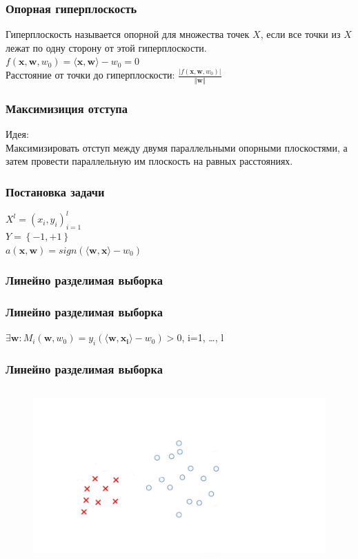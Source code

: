 \documentclass[12pt]{beamer}
\begin{document}
\begin{frame}\frametitle{Опорная гиперплоскость}
Гиперплоскость называется опорной для множества точек
$X$, если все точки из $X$ лежат по одну сторону от этой гиперплоскости.\\\vspace{5mm}
${f(\mathbf{x},\mathbf{w}, w_0) = \langle \mathbf{x}, \mathbf{w}\rangle - w_0 = 0}$\\
\vspace{5mm}
Расстояние от точки до гиперплоскости:
$\frac{\vert f(\mathbf{x},\mathbf{w}, w_0) \vert}{\Vert \mathbf{w} \Vert}$
\end{frame}

\begin{frame}\frametitle{Максимизиция отступа}
Идея:\\
Максимизировать отступ между двумя параллельными опорными плоскостями, а затем провести параллельную им плоскость на равных расстояниях.\\
\end{frame}

\begin{frame}\frametitle{Постановка задачи}
${X^l = (x_i,y_i)_{i = 1}^l}$\\ 
${Y=\left\{-1,+1\right\}}$\\
\vspace{5mm}
$a(\mathbf{x}, \mathbf{w}) = sign(\langle \mathbf{w}, \mathbf{x}\rangle - w_0)$\\
\end{frame}


\begin{frame}\frametitle{Линейно разделимая выборка}
\end{frame}

\begin{frame}\frametitle{Линейно разделимая выборка}
$\exists \mathbf{w}: M_i(\mathbf{w}, w_0) = y_i  (\langle \mathbf{w}, \mathbf{x_i} \rangle - w_0) > 0$, i=1, \dots , l\\
\end{frame}

\begin{frame}\frametitle{Линейно разделимая выборка}
\begin{figure}[htbp]
  \includegraphics[height=190pt, keepaspectratio = true]{images/linearly_separable1}   
\end{figure}
\end{frame}
\end{document}
